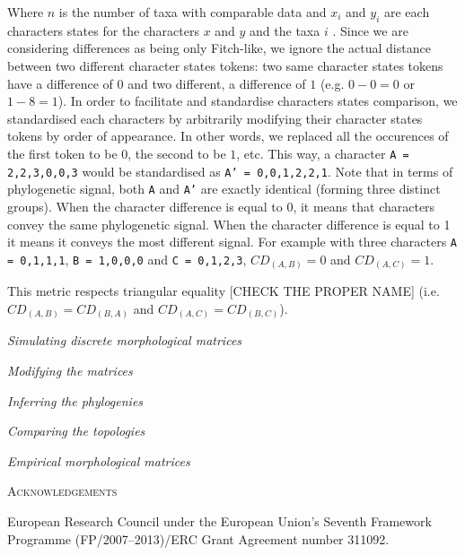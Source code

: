 \documentclass[12pt,letterpaper]{article}
\renewcommand{\section}[1]{%
\bigskip
\begin{center}
\begin{Large}
\normalfont\scshape #1
\medskip
\end{Large}
\end{center}}
\renewcommand{\subsection}[1]{%
\bigskip
\begin{center}
\begin{large}
\normalfont\itshape #1
\end{large}
\end{center}}
\begin{document}
\noindent Where $n$ is the number of taxa with comparable data and $x_i$ and $y_i$ are each characters states for the characters $x$ and $y$ and the taxa $i$ \citep[i.e. the Gower distance;][]{GowerDist}.
Since we are considering differences as being only Fitch-like, we ignore the actual distance between two different character states tokens: two same character states tokens have a difference of $0$ and two different, a difference of $1$ (e.g. $0 - 0 = 0$ or $1 - 8 = 1$).
In order to facilitate and standardise characters states comparison, we standardised each characters by arbitrarily modifying their character states tokens by order of appearance.
In other words, we replaced all the occurences of the first token to be $0$, the second to be $1$, etc.
This way, a character \texttt{A = {2,2,3,0,0,3}} would be standardised as \texttt{A' = {0,0,1,2,2,1}}. Note that in terms of phylogenetic signal, both \texttt{A} and \texttt{A'} are exactly identical (forming three distinct groups).
When the character difference is equal to $0$, it means that characters convey the same phylogenetic signal.
When the character difference is equal to 1 it means it conveys the most different signal.
For example with three characters \texttt{A = {0,1,1,1}}, \texttt{B = {1,0,0,0}} and \texttt{C = {0,1,2,3}}, $CD_{(A,B)} = 0$ and $CD_{(A,C)} = 1$.

This metric respects triangular equality [CHECK THE PROPER NAME] (i.e. $CD_{(A,B)} = CD_{(B,A)}$ and $CD_{(A,C)} = CD_{(B,C)}$).



\subsection{Simulating discrete morphological matrices}

\subsection{Modifying the matrices}

\subsection{Inferring the phylogenies}

\subsection{Comparing the topologies}

\cite{Guillerme2016146}

\subsection{Empirical morphological matrices}


\section{Acknowledgements}
European Research Council under the European Union’s Seventh Framework Programme (FP/2007–2013)/ERC Grant Agreement number 311092.




\end{document}
